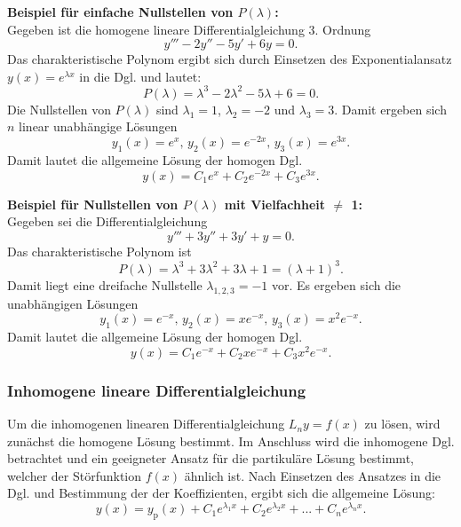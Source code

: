\noindent
\textbf{Beispiel f\"ur einfache Nullstellen von $P(\lambda)$:}\\
Gegeben ist die homogene lineare Differentialgleichung 3. Ordnung
$$
y''' -2y''-5y'+6y =0.
$$
Das charakteristische Polynom ergibt sich durch Einsetzen des Exponentialansatz $y(x) = e^{\lambda x }$ in die Dgl. und lautet:
$$
P(\lambda) = \lambda^3 -2 \lambda^2 -5 \lambda +6 =0.
$$
Die Nullstellen von $P(\lambda)$ sind $\lambda_1 = 1$, $\lambda_2=-2$ und $\lambda_3 = 3$.
Damit ergeben sich $n$ linear unabh\"angige L\"osungen
$$
y_1(x) = e^x, \, y_2(x) = e^{-2x}, \, y_3(x)= e^{3x}.
$$
Damit lautet die allgemeine L\"osung der homogen Dgl.
$$
y(x) = C_1 e^{x} + C_2 e^{-2x} + C_3 e^{3x}.
$$

\noindent
\textbf{Beispiel f\"ur Nullstellen von $P(\lambda)$ mit Vielfachheit $\neq$ 1:}\\
Gegeben sei die Differentialgleichung
$$
y'''+3y''+3y'+y =0.
$$
Das charakteristische Polynom ist
$$
P(\lambda) =  \lambda^3 +3\lambda^2+3\lambda+1 = (\lambda+1)^3.
$$
Damit liegt eine dreifache Nullstelle $\lambda_{1,2,3} = -1$ vor. Es ergeben sich die unabh\"angigen L\"osungen
$$
y_1(x) = e^{-x}, \, y_2(x) = xe^{-x}, \, y_3(x)= x^2e^{-x}.
$$
Damit lautet die allgemeine L\"osung der homogen Dgl.
$$
y(x) = C_1 e^{-x} + C_2 xe^{-x} + C_3 x^2e^{-x}.
$$

\subsubsection*{Inhomogene lineare Differentialgleichung}
Um die inhomogenen linearen Differentialgleichung $L_n y = f(x)$ zu l\"osen, wird zun\"achst die homogene L\"osung bestimmt. Im Anschluss wird die inhomogene Dgl. betrachtet und ein geeigneter Ansatz f\"ur die partikul\"are L\"osung bestimmt, welcher der St\"orfunktion $f(x)$ \"ahnlich ist. Nach Einsetzen des Ansatzes in die Dgl. und Bestimmung der der Koeffizienten, ergibt sich die allgemeine L\"osung:
$$
y(x)   =y_{\text{p}}(x)+ C_1  e^{\lambda_1 x} + C_2 e^{\lambda_2 x}  + ... + C_n e^{\lambda_n x} .
$$

